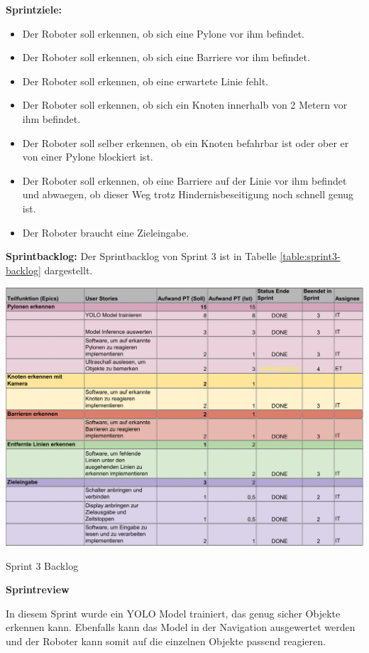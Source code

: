\textbf{Sprintziele:}
\begin{itemize}
    \item Der Roboter soll erkennen, ob sich eine Pylone vor ihm befindet.
    \item Der Roboter soll erkennen, ob sich eine Barriere vor ihm befindet.
    \item Der Roboter soll erkennen, ob eine erwartete Linie fehlt.
    \item Der Roboter soll erkennen, ob sich ein Knoten innerhalb von 2 Metern vor ihm befindet.
    \item Der Roboter soll selber erkennen, ob ein Knoten befahrbar ist oder ober er von einer Pylone blockiert ist.
    \item Der Roboter soll erkennen, ob eine Barriere auf der Linie vor ihm befindet und abwaegen, ob dieser Weg trotz Hindernisbeseitigung noch schnell genug ist.
    \item Der Roboter braucht eine Zieleingabe.

\end{itemize}

\textbf{Sprintbacklog:} Der Sprintbacklog von Sprint 3 ist in Tabelle 
\ref{table:sprint3-backlog} 
dargestellt.


\begin{table}[H]
\centering
\includegraphics[width=\textwidth]{assets/projektmanagement/sprint3-crop.pdf}
\caption{Sprint 3 Backlog}
\label{table:sprint3-backlog}
\end{table}


\textbf{Sprintreview}

In diesem Sprint wurde ein YOLO Model trainiert, das genug sicher Objekte erkennen kann. Ebenfalls kann das Model in der Navigation ausgewertet werden und der Roboter kann somit auf die einzelnen Objekte passend reagieren. 

